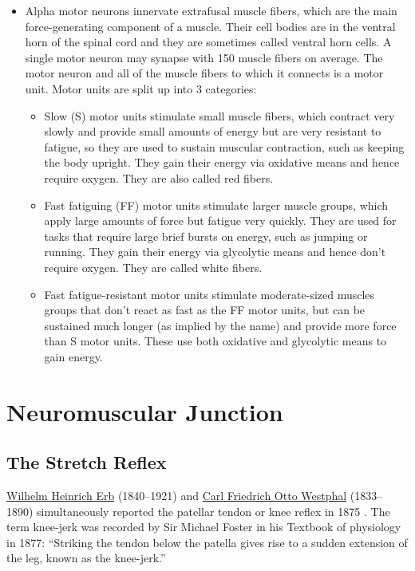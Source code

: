 \begin{itemize}
\item
  Alpha motor neurons innervate extrafusal muscle fibers, which are the main force-generating component of a muscle. Their cell bodies are in the ventral horn of the spinal cord and they are sometimes called ventral horn cells. A single motor neuron may synapse with 150 muscle fibers on average. The motor neuron and all of the muscle fibers to which it connects is a motor unit. Motor units are split up into 3 categories:

  \begin{itemize}
  \tightlist
  \item
    Slow (S) motor units stimulate small muscle fibers, which contract very slowly and provide small amounts of energy but are very resistant to fatigue, so they are used to sustain muscular contraction, such as keeping the body upright. They gain their energy via oxidative means and hence require oxygen. They are also called red fibers.
  \item
    Fast fatiguing (FF) motor units stimulate larger muscle groups, which apply large amounts of force but fatigue very quickly. They are used for tasks that require large brief bursts on energy, such as jumping or running. They gain their energy via glycolytic means and hence don't require oxygen. They are called white fibers.
  \item
    Fast fatigue-resistant motor units stimulate moderate-sized muscles groups that don't react as fast as the FF motor units, but can be sustained much longer (as implied by the name) and provide more force than S motor units. These use both oxidative and glycolytic means to gain energy.
  \end{itemize}
\end{itemize}

\hypertarget{neuromuscular-junction}{%
\section{Neuromuscular Junction}\label{neuromuscular-junction}}

\hypertarget{the-stretch-reflex}{%
\subsection{The Stretch Reflex}\label{the-stretch-reflex}}

\href{https://en.wikipedia.org/wiki/Wilhelm_Heinrich_Erb}{Wilhelm Heinrich Erb} (1840--1921) and \href{https://en.wikipedia.org/wiki/Carl_Friedrich_Otto_Westphal}{Carl Friedrich Otto Westphal} (1833--1890) simultaneously reported the patellar tendon or knee reflex in 1875 . The term knee-jerk was recorded by Sir Michael Foster in his Textbook of physiology in 1877: ``Striking the tendon below the patella gives rise to a sudden extension of the leg, known as the knee-jerk.''

